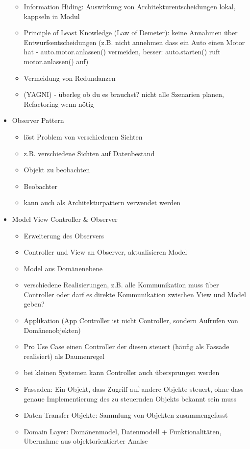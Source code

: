 \documentclass[paper=a4, fontsize=11pt]{scrartcl} %
\numberwithin{equation}{section} %
\numberwithin{figure}{section} %
\numberwithin{table}{section} %
\begin{document}
\begin{itemize}
\begin{itemize}
    \item Information Hiding: Auswirkung von Architekturentscheidungen lokal, kappseln in Modul
    \item Principle of Least Knowledge (Law of Demeter): keine Annahmen über Entwurfsentscheidungen (z.B. nicht annehmen dass ein Auto einen Motor hat - auto.motor.anlassen() vermeiden, besser: auto.starten() ruft motor.anlassen() auf)
    \item Vermeidung von Redundanzen
    \item (YAGNI) - überleg ob du es brauchst? nicht alle Szenarien planen, Refactoring wenn nötig
  \end{itemize}
  \item Observer Pattern
  \begin{itemize}
    \item löst Problem von verschiedenen Sichten
    \item z.B. verschiedene Sichten auf Datenbestand
    \item Objekt zu beobachten
    \item Beobachter
    \item kann auch als Architekturpattern verwendet werden
  \end{itemize}
  \item Model View Controller \& Observer
  \begin{itemize}
    \item Erweiterung des Observers
    \item Controller und View an Observer, aktualisieren Model
    \item Model aus Domänenebene
    \item verschiedene Realisierungen, z.B. alle Kommunikation muss über Controller oder darf es direkte Kommunikation zwischen View und Model geben?
    \item Applikation (App Controller ist nicht Controller, sondern Aufrufen von Domänenobjekten)
    \item Pro Use Case einen Controller der diesen steuert (häufig als Fassade realisiert) als Daumenregel
    \item bei kleinen Systemen kann Controller auch übersprungen werden
    \item Fassaden: Ein Objekt, dass Zugriff auf andere Objekte steuert, ohne dass genaue Implementierung des zu steuernden Objekts bekannt sein muss
    \item Daten Transfer Objekte: Sammlung von Objekten zusammengefasst
    \item Domain Layer: Domänenmodel, Datenmodell + Funktionalitäten, Übernahme aus objektorientierter Analse

\end{itemize}
\end{itemize}
\end{document}
